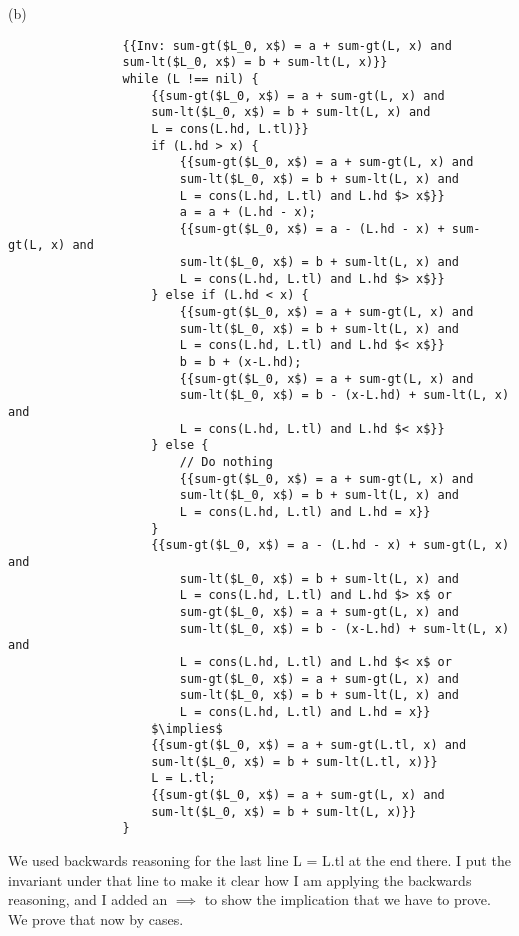 \documentclass[12pt]{article}
\theoremstyle{definitionstyle}
\begin{document}
\begin{enumerate}[labelindent=0pt, labelwidth=!, wide]
            (b) \begin{lstlisting}
                {{Inv: sum-gt($L_0, x$) = a + sum-gt(L, x) and
                sum-lt($L_0, x$) = b + sum-lt(L, x)}}
                while (L !== nil) {
                    {{sum-gt($L_0, x$) = a + sum-gt(L, x) and
                    sum-lt($L_0, x$) = b + sum-lt(L, x) and
                    L = cons(L.hd, L.tl)}}
                    if (L.hd > x) {
                        {{sum-gt($L_0, x$) = a + sum-gt(L, x) and
                        sum-lt($L_0, x$) = b + sum-lt(L, x) and
                        L = cons(L.hd, L.tl) and L.hd $> x$}}
                        a = a + (L.hd - x);
                        {{sum-gt($L_0, x$) = a - (L.hd - x) + sum-gt(L, x) and
                        sum-lt($L_0, x$) = b + sum-lt(L, x) and
                        L = cons(L.hd, L.tl) and L.hd $> x$}}
                    } else if (L.hd < x) {
                        {{sum-gt($L_0, x$) = a + sum-gt(L, x) and
                        sum-lt($L_0, x$) = b + sum-lt(L, x) and
                        L = cons(L.hd, L.tl) and L.hd $< x$}}
                        b = b + (x-L.hd);
                        {{sum-gt($L_0, x$) = a + sum-gt(L, x) and
                        sum-lt($L_0, x$) = b - (x-L.hd) + sum-lt(L, x) and
                        L = cons(L.hd, L.tl) and L.hd $< x$}}
                    } else {
                        // Do nothing
                        {{sum-gt($L_0, x$) = a + sum-gt(L, x) and
                        sum-lt($L_0, x$) = b + sum-lt(L, x) and
                        L = cons(L.hd, L.tl) and L.hd = x}}
                    }
                    {{sum-gt($L_0, x$) = a - (L.hd - x) + sum-gt(L, x) and
                        sum-lt($L_0, x$) = b + sum-lt(L, x) and
                        L = cons(L.hd, L.tl) and L.hd $> x$ or
                        sum-gt($L_0, x$) = a + sum-gt(L, x) and
                        sum-lt($L_0, x$) = b - (x-L.hd) + sum-lt(L, x) and
                        L = cons(L.hd, L.tl) and L.hd $< x$ or
                        sum-gt($L_0, x$) = a + sum-gt(L, x) and
                        sum-lt($L_0, x$) = b + sum-lt(L, x) and
                        L = cons(L.hd, L.tl) and L.hd = x}}
                    $\implies$
                    {{sum-gt($L_0, x$) = a + sum-gt(L.tl, x) and
                    sum-lt($L_0, x$) = b + sum-lt(L.tl, x)}}
                    L = L.tl;
                    {{sum-gt($L_0, x$) = a + sum-gt(L, x) and
                    sum-lt($L_0, x$) = b + sum-lt(L, x)}}
                }
            \end{lstlisting}
            We used backwards reasoning for the last line L = L.tl at the end there. I put the invariant under that line to make it clear how I am applying the backwards reasoning, and I added an $\implies$ to show the implication that we have to prove. We prove that now by cases. 
        

\end{enumerate}
\end{document}
